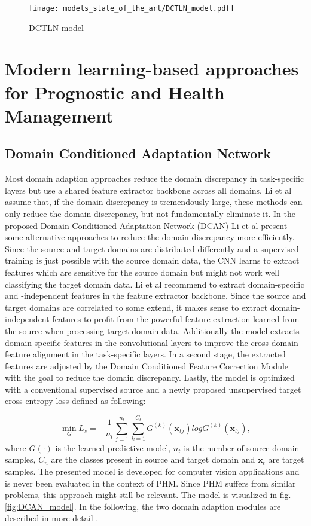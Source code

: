 \begin{figure}[H]
  \centering
  \texttt{[image: models\_state\_of\_the\_art/DCTLN\_model.pdf]}
  \caption{DCTLN model \cite{Guo2019}}
  \label{fig:DCTLN_model}
\end{figure}

\section{Modern learning-based approaches for Prognostic and Health Management }
\subsection{Domain Conditioned Adaptation Network}
Most domain adaption approaches reduce the domain discrepancy in task-specific layers but use a shared feature extractor backbone across all domains. Li et al \cite{li2020} assume that, if the domain discrepancy is tremendously large, these methods can only reduce the domain discrepancy, but not fundamentally eliminate it. In the proposed Domain Conditioned Adaptation Network (DCAN) Li et al present some alternative approaches to reduce the domain discrepancy more efficiently. Since the source and target domains are distributed differently and a supervised training is just possible with the source domain data, the CNN learns to extract features which are sensitive for the source domain but might not work well classifying the target domain data. Li et al recommend to extract domain-specific and -independent features in the feature extractor backbone. Since the source and target domains are correlated to some extend, it makes sense to extract domain-independent features to profit from the powerful feature extraction learned from the source when processing target domain data. Additionally the model extracts domain-specific features in the convolutional layers to improve the cross-domain feature alignment in the task-specific layers. In a second stage, the extracted features are adjusted by the Domain Conditioned Feature Correction Module with the goal to reduce the domain discrepancy. Lastly, the model is optimized with a conventional supervised source and a newly proposed unsupervised target cross-entropy loss defined as following:

\begin{equation}
    \min_{G} L_{s} = -\frac{1}{n_{t}} \sum_{j=1}^{n_{t}} \sum_{k=1}^{C_{t}} G^{(k)}(\pmb{x}_{tj})logG^{(k)}(\pmb{x}_{tj}),
\end{equation}
where $G(\cdot)$ is the learned predictive model, $n_{t}$ is the number of source domain samples, $C_{n}$ are the classes present in source and target domain and $\pmb{x}_{t}$ are target samples. The presented model is developed for computer vision applications and is never been evaluated in the context of PHM. Since PHM suffers from similar problems, this approach might still be relevant. The model is visualized in fig. \ref{fig:DCAN_model}. In the following, the two domain adaption modules are described in more detail \cite{li2020}. 


